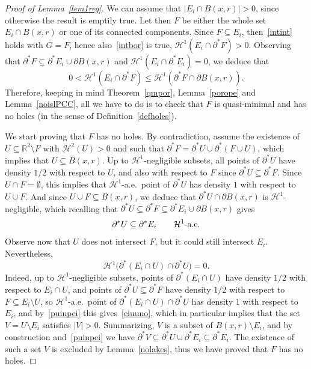 \documentclass[10pt]{amsart}
\newcommand\R{\mathbb{R}}
\renewcommand\H{\mathcal{H}}
\theoremstyle{plain}
\theoremstyle{definition}
\begin{document}
\begin{proof}[Proof of Lemma~\ref{lem1reg}]
We can assume that $|E_i\cap B(x,r)|>0$, since otherwise the result is emptily true. Let then $F$ be either the whole set $E_i\cap B(x,r)$ or one of its connected components. Since $F\subseteq E_i$, then~\eqref{intint} holds with $G=F$, hence also~\eqref{intbor} is true, \ie $\H^1(E_i \cap \partial^* F)>0$. Observing that $\partial^* F\subseteq \partial^* E_i \cup \partial B(x,r)$ and $\H^1(E_i\cap\partial^* E_i)=0$, we deduce that
\[
0<\H^1(E_i \cap\partial^* F)\leq\H^1(\partial^* F\cap \partial B(x,r)).
\]
Therefore, keeping in mind Theorem~\ref{qmpor}, Lemma~\ref{porope} and Lemma~\ref{noislPCC}, all we have to do is to check that $F$ is quasi-minimal and has no holes (in the sense of Definition~\ref{defholes}).

We start proving that $F$ has no holes. By contradiction, assume the existence of $U\subseteq\R^2\setminus F$ with $\H^2(U)>0$ and such that $\partial^* F =\partial^* U \cup \partial^*(F\cup U)$, which implies that $U\subseteq B(x,r)$. Up to $\H^1$-negligible subsets, all points of $\partial^* U$ have density $1/2$ with respect to $U$, and also with respect to $F$ since $\partial^* U \subseteq \partial^* F$. Since $U\cap F=\emptyset$, this implies that $\H^1$-a.e.\ point of $\partial^* U$ has density $1$ with respect to $U\cup F$. And since $U\cup F\subseteq B(x,r)$, we deduce that $\partial^* U\cap\partial B(x,r)$ is $\H^1$-negligible, which recalling that $\partial^* U \subseteq \partial^* F \subseteq \partial^* E_i \cup \partial B(x,r)$ gives
\begin{equation}\label{puinpei}
\partial^* U\subseteq \partial^* E_i \qquad \H^1\hbox{-a.e.}
\end{equation}
Observe now that $U$ does not intersect $F$, but it could still intersect $E_i$. Nevertheless,
\begin{equation}\label{eiuuno}
\H^1\big(\partial^*(E_i\cap U) \cap \partial^* U \big)=0.
\end{equation}
Indeed, up to $\H^1$-negligible subsets, points of $\partial^*(E_i \cap U)$ have density $1/2$ with respect to $E_i\cap U$, and points of $\partial^* U\subseteq \partial^* F$ have density $1/2$ with respect to $F\subseteq E_i\setminus U$, so $\H^1$-a.e.\ point of $\partial^*(E_i\cap U) \cap \partial^* U$ has density $1$ with respect to $E_i$, and by~\eqref{puinpei} this gives~\eqref{eiuuno}, which in particular implies that the set $V=U\setminus E_i$ satisfies $|V|>0$. Summarizing, $V$ is a subset of $B(x,r)\setminus E_i$, and by construction and~\eqref{puinpei} we have $\partial^* V\subseteq \partial^* U \cup \partial^* E_i\subseteq \partial^* E_i$. The existence of such a set $V$ is excluded by Lemma~\ref{nolakes}, thus we have proved that $F$ has no holes.


\end{proof}
\end{document}
